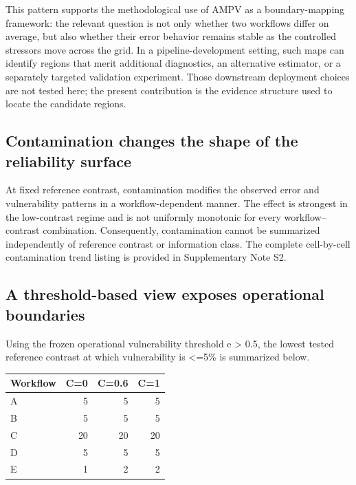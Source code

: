 This pattern supports the methodological use of AMPV as a
boundary-mapping framework: the relevant question is not only whether
two workflows differ on average, but also whether their error behavior
remains stable as the controlled stressors move across the grid. In a
pipeline-development setting, such maps can identify regions that merit
additional diagnostics, an alternative estimator, or a separately
targeted validation experiment. Those downstream deployment choices are
not tested here; the present contribution is the evidence structure used
to locate the candidate regions.

\subsection{Contamination changes the shape of the reliability
surface}\label{contamination-changes-the-shape-of-the-reliability-surface}

At fixed reference contrast, contamination modifies the observed error
and vulnerability patterns in a workflow-dependent manner. The effect is
strongest in the low-contrast regime and is not uniformly monotonic for
every workflow--contrast combination. Consequently, contamination cannot
be summarized independently of reference contrast or information class.
The complete cell-by-cell contamination trend listing is provided in
Supplementary Note S2.

\subsection{A threshold-based view exposes operational
boundaries}\label{a-threshold-based-view-exposes-operational-boundaries}

Using the frozen operational vulnerability threshold \textbar e\textbar{}
\textgreater{} 0.5, the lowest tested reference contrast at which
vulnerability is \textless=5\% is summarized below.

\begin{longtable}[]{@{}lrrr@{}}
\toprule\noalign{}
Workflow & C=0 & C=0.6 & C=1 \\
\midrule\noalign{}
\endhead
\bottomrule\noalign{}
\endlastfoot
A & 5 & 5 & 5 \\
B & 5 & 5 & 5 \\
C & 20 & 20 & 20 \\
D & 5 & 5 & 5 \\
E & 1 & 2 & 2 \\
\end{longtable}

